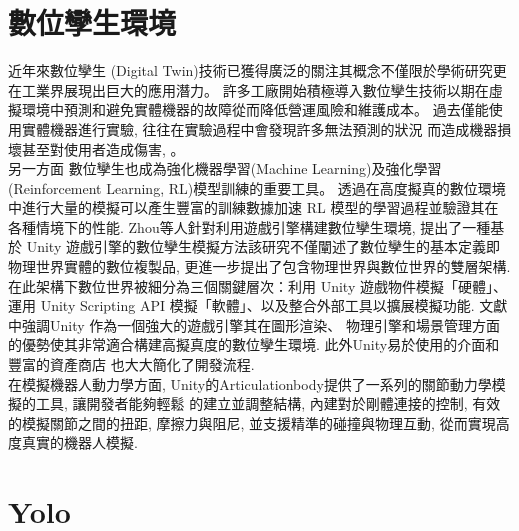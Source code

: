 \section{數位孿生環境}
近年來數位孿生 (Digital Twin)技術已獲得廣泛的關注其概念不僅限於學術研究更在工業界展現出巨大的應用潛力。
許多工廠開始積極導入數位孿生技術以期在虛擬環境中預測和避免實體機器的故障從而降低營運風險和維護成本。
過去僅能使用實體機器進行實驗, 往往在實驗過程中會發現許多無法預測的狀況
而造成機器損壞甚至對使用者造成傷害, 。\\
另一方面
數位孿生也成為強化機器學習(Machine Learning)及強化學習(Reinforcement Learning, RL)模型訓練的重要工具。
透過在高度擬真的數位環境中進行大量的模擬可以產生豐富的訓練數據加速 RL 模型的學習過程並驗證其在各種情境下的性能.
Zhou等人\cite{DigitalTwin}針對利用遊戲引擎構建數位孿生環境,
提出了一種基於 Unity 遊戲引擎的數位孿生模擬方法該研究不僅闡述了數位孿生的基本定義即物理世界實體的數位複製品,
更進一步提出了包含物理世界與數位世界的雙層架構. 在此架構下數位世界被細分為三個關鍵層次：利用 Unity 遊戲物件模擬「硬體」、
運用 Unity Scripting API 模擬「軟體」、以及整合外部工具以擴展模擬功能. 文獻中強調Unity 作為一個強大的遊戲引擎其在圖形渲染、
物理引擎和場景管理方面的優勢使其非常適合構建高擬真度的數位孿生環境. 此外Unity易於使用的介面和豐富的資產商店 也大大簡化了開發流程. \\
在模擬機器人動力學方面, Unity的Articulationbody\cite{UnityArticulation2024}提供了一系列的關節動力學模擬的工具, 讓開發者能夠輕鬆
的建立並調整結構, 內建對於剛體連接的控制, 有效的模擬關節之間的扭距, 摩擦力與阻尼, 並支援精準的碰撞與物理互動, 從而實現高度真實的機器人模擬.
\section{Yolo}

